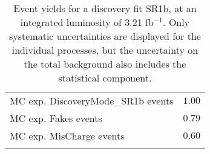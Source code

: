 \begin{table}
\begin{center}
{\begin{tabular*}{\textwidth}{@{\extracolsep{\fill}}lr}
        MC exp. DiscoveryMode\_SR1b events         & $1.00$              \\
        MC exp. Fakes events         & $0.79$              \\
        MC exp. MisCharge events         & $0.60$              \\
\noalign{\smallskip}\hline\noalign{\smallskip}
\end{tabular*}
}
\end{center}
\caption{Event yields for a discovery fit SR1b, at an integrated luminosity of 3.21 fb$^{-1}$. Only systematic uncertainties are displayed for the individual processes, but the uncertainty on the total background also includes the statistical component.}
\label{tab:histfitter:yields:disc:SR1b}
\end{table}
%

